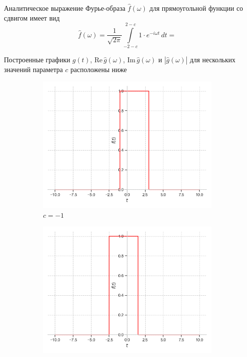 \documentclass[a4paper, 16pt]{article}
\begin{document}
    \noindent Аналитическое выражение Фурье-образа
    $\hat{f}(\omega)$ для прямоугольной функции со сдвигом имеет вид
    $$
    \hat{f}(\omega)=\dfrac{1}{\sqrt{2\pi}}\int\limits_{-2-c}^{2-c}1\cdot e^{-i\omega t}\,dt=    %
    $$


    \noindent Построенные графики $g(t)$, $\text{Re}\,{\hat{g}(\omega)}$,
    $\text{Im}\,{\hat{g}(\omega)}$ и $|\hat{g}(\omega)|$
    для нескольких значений параметра $c$ расположены ниже
    \begin{figure}[htbp]
        \centering
        \begin{subfigure}{0.3\textwidth}
            \centering
            \includegraphics[width=\linewidth]{sh_m1_rectf_int12.png}
            \caption{$c=-1$}
            \label{fig:shrectf_1}
        \end{subfigure}
        \hfill
        \begin{subfigure}{0.3\textwidth}
            \centering
            \includegraphics[width=\linewidth]{sh_zp5_rectf_int12.png}

\end{subfigure}
\end{figure}
\end{document}

